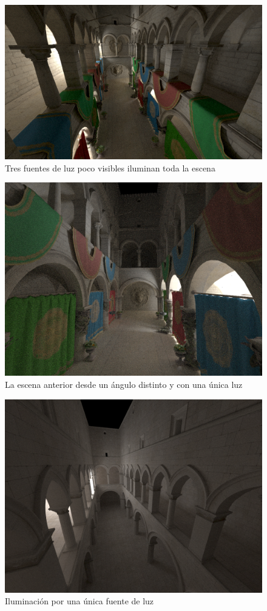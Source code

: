 \begin{figure}
\centering
\includegraphics[width=5in]{crytek_sponza1.png}
\caption{Tres fuentes de luz poco visibles iluminan toda la escena}
\end{figure}

\clearpage

\begin{figure}
\centering
\includegraphics[width=5in]{lion_closer.png}
\caption{La escena anterior desde un ángulo distinto y con una única luz}
\end{figure}

\begin{figure}
\centering
\includegraphics[width=5in]{single_light_sponza.png}
\caption{Iluminación por una única fuente de luz}
\end{figure}

